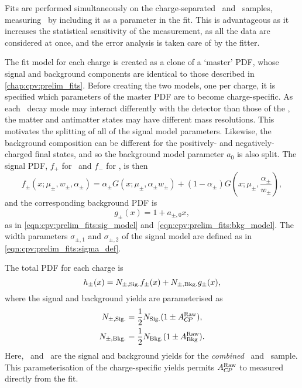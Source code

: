 Fits are performed simultaneously on the charge-separated \PLambdac\ and 
\APLambdac\ samples, measuring \ARaw\ by including it as a parameter in the 
fit.
This is advantageous as it increases the statistical sensitivity of the 
measurement, as all the data are considered at once, and the error analysis is 
taken care of by the fitter.

The fit model for each charge is created as a clone of a `master' \ac{PDF}, 
whose signal and background components are identical to those described in 
\cref{chap:cpv:prelim_fits}.
Before creating the two models, one per charge, it is specified which 
parameters of the master \ac{PDF} are to become charge-specific.
As each \PLambdac\ decay mode may interact differently with the detector than 
those of the \APLambdac, the matter and antimatter states may have different 
mass resolutions.
This motivates the splitting of all of the signal model parameters.
Likewise, the background composition can be different for the positively- and 
negatively-charged final states, and so the background model parameter $a_{0}$ 
is also split.
The signal \ac{PDF}, $f_{+}$ for \PLambdac\ and $f_{-}$ for \APLambdac, is then
\begin{equation}
  f_{\pm}(x; \mu_{\pm}, w_{\pm}, \alpha_{\pm}) =
    \alpha_{\pm}{}G(x; \mu_{\pm}, \alpha_{\pm}w_{\pm}) +
    (1 - \alpha_{\pm})G(x; \mu_{\pm}, \frac{\alpha_{\pm}}{w_{\pm}}),
\end{equation}
and the corresponding background \ac{PDF} is
\begin{equation}
  g_{\pm}(x) = 1 + a_{\pm,0}x,
\end{equation}
as in \cref{eqn:cpv:prelim_fits:sig_model} 
and~\cref{eqn:cpv:prelim_fits:bkg_model}.
The width parameters $\sigma_{\pm, 1}$ and  $\sigma_{\pm, 2}$ of the signal 
model are defined as in \cref{eqn:cpv:prelim_fits:sigma_def}.

The total \ac{PDF} for each charge is
\begin{equation}
  h_{\pm}(x) = N_{\pm,\text{Sig.}} f_{\pm}(x) + N_{\pm,\text{Bkg.}} g_{\pm}(x),
\end{equation}
where the signal and background yields are parameterised as
\begin{align}
  N_{\pm,\text{Sig.}} &= \frac{1}{2}N_{\text{Sig.}}(1 \pm A_{C\!P}^{\textnormal{Raw}}),\\
  N_{\pm,\text{Bkg.}} &= \frac{1}{2}N_{\text{Bkg.}}(1 \pm A_{\textnormal{Bkg}}^{\textnormal{Raw}}).
\end{align}
Here, \nsig\ and \nbkg\ are the signal and background yields for the 
\emph{combined} \PLambdac\ and \APLambdac\ sample.
This parameterisation of the charge-specific yields permits $A_{C\!P}^{\textnormal{Raw}}$ to measured 
directly from the fit.

